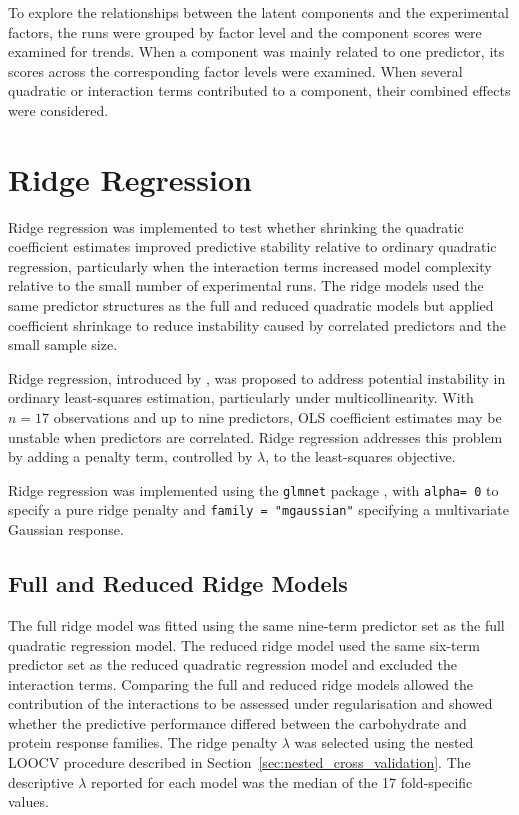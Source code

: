 \documentclass[MScDSA]{uccthesis}
\begin{document}
To explore the relationships between the latent components and the experimental factors, the runs were grouped by factor level and the component scores were examined for trends. When a component was mainly related to one predictor, its scores across the corresponding factor levels were examined. When several quadratic or interaction terms contributed to a component, their combined effects were considered.

\section{Ridge Regression}
\label{sec:ridge_regression}
Ridge regression was implemented to test whether shrinking the quadratic coefficient estimates improved predictive stability relative to ordinary quadratic regression, particularly when the interaction terms increased model complexity relative to the small number of experimental runs. The ridge models used the same predictor structures as the full and reduced quadratic models but applied coefficient shrinkage to reduce instability caused by correlated predictors and the small sample size. 

Ridge regression, introduced by \parencite{Hoerl:1970}, was proposed to address potential instability in ordinary least-squares estimation, particularly under multicollinearity. With $n=17$ observations and up to nine predictors, OLS coefficient estimates may be unstable when predictors are correlated. Ridge regression addresses this problem by adding a penalty term, controlled by $\lambda$, to the least-squares objective.

Ridge regression was implemented using the \texttt{glmnet} package \parencite{Friedman:2010}, with \texttt{alpha= 0} to specify a pure ridge penalty and \texttt{family = "mgaussian"} specifying a multivariate Gaussian response.

\subsection{Full and Reduced Ridge Models}
\label{sec:full_and_reduced_ridge_model}
The full ridge model was fitted using the same nine-term predictor set as the full quadratic regression model. The reduced ridge model used the same six-term predictor set as the reduced quadratic regression model and excluded the interaction terms. Comparing the full and reduced ridge models allowed the contribution of the interactions to be assessed under regularisation and showed whether the predictive performance differed between the carbohydrate and protein response families. The ridge penalty $\lambda$ was selected using the nested LOOCV procedure described in Section~\ref{sec:nested_cross_validation}. The descriptive $\lambda$ reported for each model was the median of the 17 fold-specific values.
\end{document}
